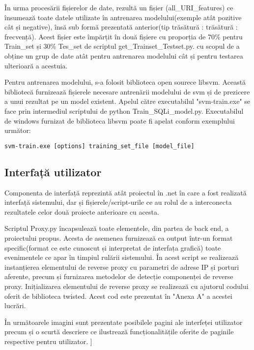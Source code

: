 În urma procesării fișierelor de date, rezultă un fișier (all\_URI\_features)  ce însumează toate datele utilizate în antrenarea modelului(exemple atât pozitive cât și negative), însă sub formă prezentată anterior(tip trăsătură :  trăsătură : frecvență). Acest fișier este împărțit în două fișiere cu proporția  de 70\% pentru Train\_set și 30\% Tes\_set de scriptul get\_Trainset\_Testset.py.  cu scopul de a obține un grup de date atât pentru antrenarea modelului cât și pentru testarea ulterioară a acestuia. 

Pentru antrenarea modelului, s-a folosit biblioteca open sourece libsvm. Această bibliotecă furnizează fișierele necesare antrenării modelului de svm și de prezicere a unui rezultat pe un model existent. Apelul către executabilul "svm-train.exe" se face prin intermediul scriptului de python  Train\_SQLi\_model.py.
Executabilul de windows furnizat de biblioteca libsvm poate fi apelat conform exemplului următor: 

\begin{lstlisting} 
svm-train.exe [options] training_set_file [model_file]
\end{lstlisting}

\subsection{Interfață utilizator}

 Componenta de interfață reprezintă atât proiectul în .net în care a fost realizată interfață sistemului, dar și fișierele/script-urile ce au rolul de a interconecta rezultatele celor două proiecte anterioare cu acesta. 

Scriptul Proxy.py încapsulează toate elementele, din partea de back end, a proiectului propus. Acesta de asemenea furnizează ca output într-un format specific(format ce este cunoscut și interpretat de interfața grafică) toate evenimentele ce apar în timpiul rulării sistemului. În acest script se realizează instanțierea elementului de reverse proxy cu parametri de adrese IP și porturi aferente, precum și furnizarea metodelor de detecție componenței de reverse proxy. Inițializarea elementului de reverse proxy se realizează cu ajutorul codului oferit de biblioteca twisted. Acest cod este prezentat în "Anexa A" a acestei lucrări. 

În următoarele imagini sunt prezentate posibilele pagini ale interfeței utilizator precum și o scurtă descriere ce ilustrează funcționalitățile oferite de paginile respective pentru utilizator. 
\newpage]
 
